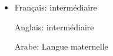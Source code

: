 
\begin{itemize}
\renewcommand{\labelitemi}{}
    \item 


\begin{cvskills}


  \cvskill
    {Français:} %
    {intermédiaire} %
    
  \cvskill
    {Anglais:} %
    {intermédiaire} %


  \cvskill
    {Arabe:} %
    {Langue maternelle} %


\end{cvskills}
\end{itemize}
